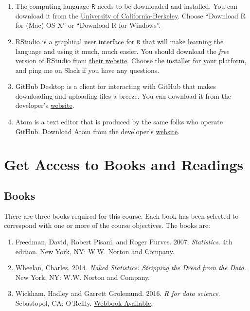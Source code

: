\documentclass[]{book}
\theoremstyle{definition}
\theoremstyle{definition}
\theoremstyle{remark}
\begin{document}
\begin{enumerate}
\def\labelenumi{\arabic{enumi}.}
\item
  The computing language \texttt{R} needs to be downloaded and
  installed. You can download it from the
  \href{https://cran.cnr.berkeley.edu}{University of
  California-Berkeley}. Choose ``Download R for (Mac) OS X'' or
  ``Download R for Windows''.
\item
  RStudio is a graphical user interface for \texttt{R} that will make
  learning the language and using it much, much easier. You should
  download the \emph{free} version of RStudio from
  \href{https://www.rstudio.com/products/rstudio/download/\#download}{their
  website}. Choose the installer for your platform, and ping me on Slack
  if you have any questions.
\item
  GitHub Desktop is a client for interacting with GitHub that makes
  downloading and uploading files a breeze. You can download it from the
  developer's \href{http://desktop.github.com}{website}.
\item
  Atom is a text editor that is produced by the same folks who operate
  GitHub. Download Atom from the developer's
  \href{http://atom.io}{website}.
\end{enumerate}

\section{Get Access to Books and
Readings}\label{get-access-to-books-and-readings}

\subsection{Books}\label{books}

There are three books required for this course. Each book has been
selected to correspond with one or more of the course objectives. The
books are:

\begin{enumerate}
\def\labelenumi{\arabic{enumi}.}
\item
  Freedman, David, Robert Pisani, and Roger Purves. 2007.
  \emph{Statistics}. 4th edition. New York, NY: W.W. Norton and Company.
\item
  Wheelan, Charles. 2014. \emph{Naked Statistics: Stripping the Dread
  from the Data}. New York, NY: W.W. Norton and Company.
\item
  Wickham, Hadley and Garrett Grolemund. 2016. \emph{R for data
  science}. Sebastopol, CA: O'Reilly.
  \href{http://r4ds.had.co.nz}{Webbook Available}.
\end{enumerate}
\end{document}
